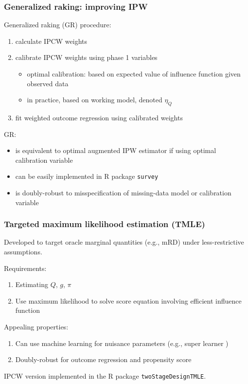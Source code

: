 \documentclass[10pt, table]{beamer}
\begin{document}
\begin{frame} \frametitle{Generalized raking: improving IPW}

Generalized raking (GR) procedure: \citep{deville1993generalized} \vspace{-0.4cm}
\begin{enumerate}
  \item calculate IPCW weights
  \item calibrate IPCW weights using phase 1 variables
    \begin{itemize}
      \item optimal calibration: based on expected value of influence function given observed data \citep{breslow2009improved}
      \item in practice, based on working model, denoted $\eta_Q$
    \end{itemize}
  \item fit weighted outcome regression using calibrated weights
\end{enumerate} \pause

GR: \vspace{-0.4cm}
\begin{itemize}
  \item is equivalent to optimal augmented IPW estimator if using optimal calibration variable \citep{lumley2011connections}
  \item can be easily implemented in R package \texttt{survey}
  \item is doubly-robust to misspecification of missing-data model or calibration variable
\end{itemize}
\end{frame}

\begin{frame} \frametitle{Targeted maximum likelihood estimation (TMLE)}

Developed to target oracle marginal quantities (e.g., mRD) under less-restrictive assumptions. \citep{vanderlaan2006targeted}

Requirements:\vspace{-0.4cm}
\begin{enumerate}
  \item Estimating $Q$, $g$, $\pi$ \citep{rose2011targeted}
  \item Use maximum likelihood to solve score equation involving efficient influence function 
\end{enumerate}

Appealing properties:\vspace{-0.4cm}
\begin{enumerate}
  \item Can use machine learning for nuisance parameters (e.g., super learner \citep{vanderlaan2007super})
  \item Doubly-robust for outcome regression and propensity score
\end{enumerate}

IPCW version implemented in the R package \texttt{twoStageDesignTMLE}.

\end{frame}
\end{document}
